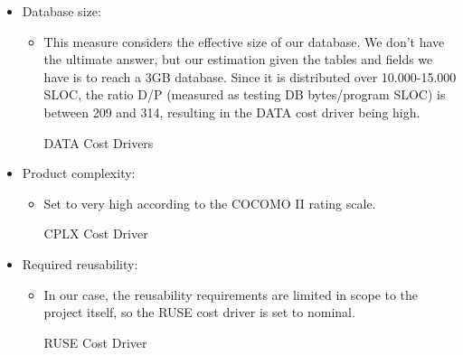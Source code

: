 \begin{itemize}
	\item Database size:
	\begin{itemize}
	\item[] This measure considers the effective size of our database. We don't have the ultimate answer, but our estimation given the tables and fields we have is to reach a 3GB database. Since it is distributed over 10.000-15.000 SLOC, the ratio D/P (measured as testing DB bytes/program SLOC) is between 209 and 314, resulting in the DATA cost driver being high. 
	\begin{costdriverstable}{DATA Cost Drivers}
		\hline
	\end{costdriverstable}
	\end{itemize}
\end{itemize}

\begin{itemize}
	\item Product complexity: 
	\begin{itemize}
	\item[] Set to very high according to the COCOMO II rating scale.
	\begin{costdriverstable}{CPLX Cost Driver}
	\end{costdriverstable}
	\end{itemize}
\end{itemize}

\begin{itemize}
	\item Required reusability: 
	\begin{itemize}
	\item[] In our case, the reusability requirements are limited in scope to the project itself, so the RUSE cost driver is set to nominal.
	\begin{costdriverstable}{RUSE Cost Driver}
		\hline
	\end{costdriverstable}
	\end{itemize}
\end{itemize}

